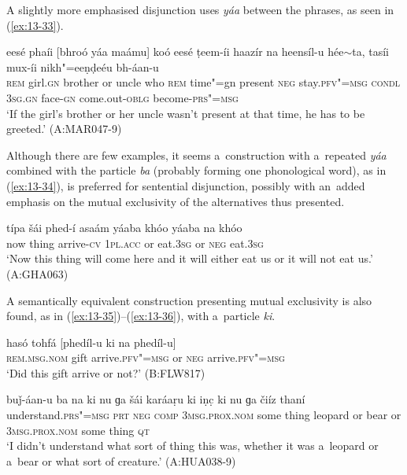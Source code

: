  A slightly more emphasised disjunction uses \textit{yáa} between the phrases, as seen in (\ref{ex:13-33}).

\begin{exe}
\ex
\label{ex:13-33}
\gll eesé phaíi [bhroó yáa maámu] koó eesé ṭeem-íi haazír na heensíl-u hée$\sim$ta, tasíi mux-íi nikh"=eeṇḍeéu bh-áan-u \\
\textsc{rem} girl.\textsc{gn} brother or uncle who \textsc{rem} time"=gn  present \textsc{neg} stay.\textsc{pfv"=msg} \textsc{condl} \textsc{3sg.gn} face-\textsc{gn}  come.out-\textsc{oblg} become-\textsc{prs"=msg}  \\
\glt `If the girl's brother or her uncle wasn't present at that time, he has to be greeted.' (A:MAR047-9) 
\end{exe}

 Although there are few examples, it seems a~construction with a~repeated \textit{yáa} combined with the particle \textit{ba} (probably forming one phonological word), as in (\ref{ex:13-34}), is preferred for sentential disjunction, possibly with an~added emphasis on the mutual exclusivity of the alternatives thus presented. 

\begin{exe}
\ex
\label{ex:13-34}
\gll típa šái phed-í asaám yáaba khóo yáaba na khóo \\
now thing arrive-\textsc{cv} \textsc{1pl.acc} or eat.\textsc{3sg} or \textsc{neg} eat.\textsc{3sg} \\
\glt `Now this thing will come here and it will either eat us or it will not eat us.' (A:GHA063) 
\end{exe}

 A semantically equivalent construction presenting mutual exclusivity is also found, as in (\ref{ex:13-35})--(\ref{ex:13-36}), with a~particle \textit{ki}. 

\begin{exe}
\ex
\label{ex:13-35}
\gll hasó tohfá [phedíl-u ki na phedíl-u] \\
\textsc{rem.msg.nom} gift arrive.\textsc{pfv"=msg} or \textsc{neg}  arrive.\textsc{pfv"=msg} \\
\glt `Did this gift arrive or not?' (B:FLW817)

\ex
\label{ex:13-36}
\gll buǰ-áan-u ba na ki nu ɡa šái karáaṛu ki iṇc̣ ki nu ɡa čiíz thaní \\
understand.\textsc{prs"=msg} \textsc{prt} \textsc{neg} \textsc{comp} \textsc{3msg.prox.nom}  some thing leopard or bear or \textsc{3msg.prox.nom} some thing \textsc{qt} \\
\glt `I didn't understand what sort of thing this was, whether it was a~leopard or a~bear or what sort of creature.' (A:HUA038-9) 
\end{exe}

